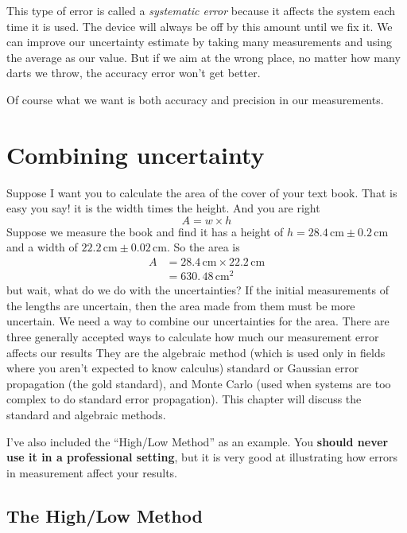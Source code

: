 \documentclass[twoside,11pt,ShortChapTitles]{BYUTextbook}
\begin{document}
This type of error is called a \emph{systematic error} because it affects the
system each time it is used. The device will always be off by this amount
until we fix it. We can improve our uncertainty estimate by taking many
measurements and using the average as our value. But if we aim at the wrong
place, no matter how many darts we throw, the accuracy error won't get better.

Of course what we want is both accuracy and precision in our measurements. 

\section{Combining uncertainty}

Suppose I want you to calculate the area of the cover of your text book. That
is easy you say! it is the width times the height. And you are right
\[
A=w\times h
\]
Suppose we measure the book and find it has a height of $h=28.4\,\text{cm} \pm0.2\,\text{cm} $ and a width of $22.2\,\text{cm} \pm0.02\,\text{cm}$. So the area is
\begin{align*}
A  & =28.4\,\text{cm} \times22.2\,\text{cm} \\
& =630.\,\allowbreak48\,\text{cm} ^{2}\end{align*}
but wait, what do we do with the uncertainties? If the initial measurements of
the lengths are uncertain, then the area made from them must be more
uncertain. We need a way to combine our uncertainties for the area.  There are three generally accepted ways to calculate how much our measurement error affects our results  They are the algebraic method (which is used only in fields where you aren't expected to know calculus) standard or Gaussian error propagation (the gold standard), and Monte Carlo (used when systems are too complex to do standard error propagation).  This chapter will discuss the standard and algebraic methods.

I've also included the ``High/Low Method'' as an example.  You {\bf should never use it in a professional setting}, but it is very good at illustrating how errors in measurement affect your results. 

\subsection{The High/Low Method}
\end{document}
